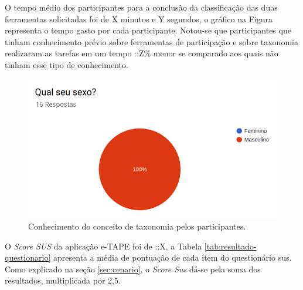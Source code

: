 \par
O tempo médio dos participantes para a conclusão da classificação das duas ferramentas solicitadas foi de X minutos e Y segundos, o gráfico na Figura \label{fig:grafico-tempo}
representa o tempo gasto por cada participante. Notou-se que participantes que tinham conhecimento prévio sobre ferramentas de participação e sobre taxonomia realizaram 
as tarefas em um tempo ::Z\% menor se comparado aos quais não tinham esse tipo de conhecimento.

\begin{figure}[!ht]
    \centering
    \includegraphics[scale=0.3]{./figuras/grafico_placeholder.png}
    \caption{Conhecimento do conceito de taxonomia pelos participantes.}
    \label{fig:grafico-tempo}
\end{figure}

\par 
O \textit{Score SUS} da aplicação e-TAPE foi de ::X, a Tabela \ref{tab:resultado-questionario} apresenta a média de pontuação de cada item do questionário \acrshort{sus}.
Como explicado na seção \ref{sec:cenario}, o \textit{Score Sus} dá-se pela soma dos resultados, multiplicada por 2,5.

